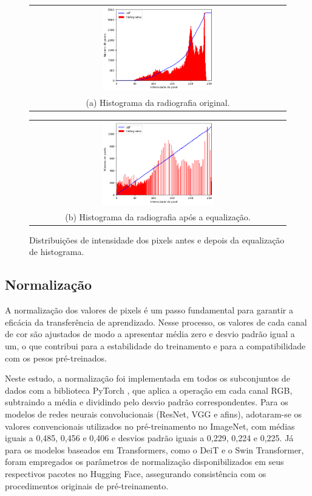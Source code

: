 \begin{figure}[!htbp]
    \centering
    \begin{tabular}{@{}c@{}}
        \includegraphics[width=0.45\textwidth]{figs/histograma-imagem-nao-equalizada.png} \\[\abovecaptionskip]
        \small (a) Histograma da radiografia original.
    \end{tabular}
    \hfill
    \begin{tabular}{@{}c@{}}
        \includegraphics[width=0.45\textwidth]{figs/histograma-imagem-equalizada.png} \\[\abovecaptionskip]
        \small (b) Histograma da radiografia após a equalização.
    \end{tabular}
    \caption{Distribuições de intensidade dos pixels antes e depois da equalização de histograma.}
    \label{fig:histogram-equalization-histogram}
\end{figure}

\subsection{Normalização}

A normalização dos valores de pixels é um passo fundamental para garantir a eficácia da transferência de aprendizado. Nesse processo, os valores de cada canal de cor são ajustados de modo a apresentar média zero e desvio padrão igual a um, o que contribui para a estabilidade do treinamento e para a compatibilidade com os pesos pré-treinados.  

Neste estudo, a normalização foi implementada em todos os subconjuntos de dados com a biblioteca PyTorch \cite{pytorch}, que aplica a operação em cada canal RGB, subtraindo a média e dividindo pelo desvio padrão correspondentes. Para os modelos de redes neurais convolucionais (ResNet, VGG e afins), adotaram-se os valores convencionais utilizados no pré-treinamento no ImageNet, com médias iguais a 0,485, 0,456 e 0,406 e desvios padrão iguais a 0,229, 0,224 e 0,225. Já para os modelos baseados em Transformers, como o DeiT e o Swin Transformer, foram empregados os parâmetros de normalização disponibilizados em seus respectivos pacotes no Hugging Face, assegurando consistência com os procedimentos originais de pré-treinamento.

